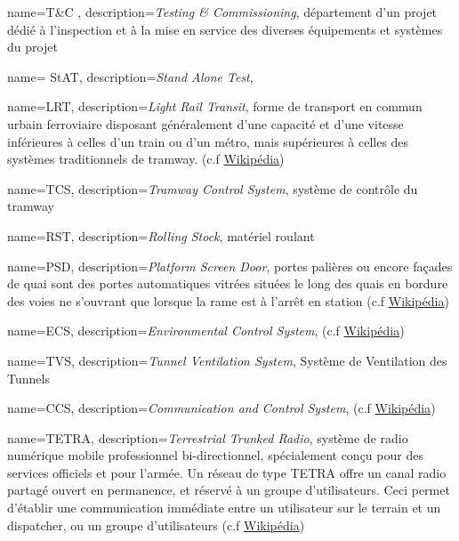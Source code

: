 \usepackage[toc,section=chapter]{glossaries}    %
\makeglossaries

{
	name=T\&C ,
	description={\textit{Testing \& Commissioning}, département d'un projet dédié à l'inspection et à la mise en service des diverses équipements et systèmes du projet}
}

{
	name= StAT,
	description={\textit{Stand Alone Test}, }
}

{
	name=LRT,
	description={\textit{Light Rail Transit}, forme de transport en commun urbain ferroviaire disposant généralement d'une capacité et d'une vitesse inférieures à celles d'un train ou d'un métro, mais supérieures à celles des systèmes traditionnels de tramway. (c.f \href{https://fr.wikipedia.org/wiki/Métro_léger}{Wikipédia})}
	}
	
{
	name=TCS,
	description={\textit{Tramway Control System}, système de contrôle du tramway}
}

{
	name=RST,
	description={\textit{Rolling Stock}, matériel roulant}
}

{
	name=PSD,
	description={\textit{Platform Screen Door}, portes palières ou encore façades de quai sont des portes automatiques vitrées situées le long des quais en bordure des voies ne s'ouvrant que lorsque la rame est à l'arrêt en station (c.f \href{https://fr.wikipedia.org/wiki/Porte_palière_(métro)}{Wikipédia})}
}

{
	name=ECS,
	description={\textit{Environmental Control System},  (c.f \href{https://fr.wikipedia.org/wiki/Porte_palière_(métro)}{Wikipédia})}
}

{
	name=TVS,
	description={\textit{Tunnel Ventilation System},  Système de Ventilation des Tunnels }
}

{
	name=CCS,
	description={\textit{Communication and Control System},  (c.f \href{https://fr.wikipedia.org/wiki/Porte_palière_(métro)}{Wikipédia})}
}

{
	name=TETRA,
	description={\textit{Terrestrial Trunked Radio}, système de radio numérique mobile professionnel bi-directionnel, spécialement conçu pour des services officiels et pour l'armée. Un réseau de type TETRA offre un canal radio partagé ouvert en permanence, et réservé à un groupe d'utilisateurs. Ceci permet d'établir une communication immédiate entre un utilisateur sur le terrain et un dispatcher, ou un groupe d'utilisateurs (c.f \href{https://fr.wikipedia.org/wiki/Terrestrial_Trunked_Radio}{Wikipédia})}
}

